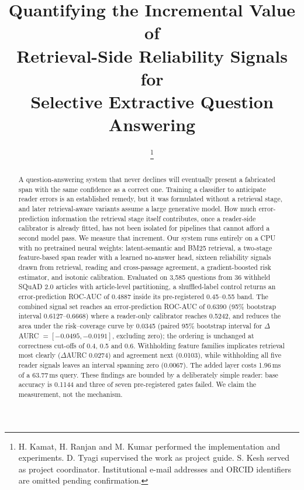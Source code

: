 \documentclass[conference]{IEEEtran}
\begin{document}
\title{Quantifying the Incremental Value of\\ Retrieval-Side Reliability Signals for\\ Selective Extractive Question Answering}

\author{%
%
\thanks{H. Kamat, H. Ranjan and M. Kumar performed the implementation and
experiments. D. Tyagi supervised the work as project guide. S. Kesh served as
project coordinator. Institutional e-mail addresses and ORCID identifiers are
omitted pending confirmation.}%
}

\maketitle

\begin{abstract}
A question-answering system that never declines will eventually present a
fabricated span with the same confidence as a correct one. Training a classifier
to anticipate reader errors is an established remedy, but it was formulated
without a retrieval stage, and later retrieval-aware variants assume a large
generative model. How much error-prediction information the retrieval stage
itself contributes, once a reader-side calibrator is already fitted, has not been
isolated for pipelines that cannot afford a second model pass. We measure that
increment. Our system runs entirely on a CPU with no pretrained neural weights:
latent-semantic and BM25 retrieval, a two-stage feature-based span reader with a
learned no-answer head, sixteen reliability signals drawn from retrieval, reading
and cross-passage agreement, a gradient-boosted risk estimator, and isotonic
calibration. Evaluated on 3{,}585 questions from 36 withheld SQuAD 2.0 articles
with article-level partitioning, a shuffled-label control returns an
error-prediction ROC-AUC of 0.4887 inside its pre-registered 0.45--0.55 band. The
combined signal set reaches an error-prediction ROC-AUC of 0.6390 (95\% bootstrap
interval 0.6127--0.6668) where a reader-only calibrator reaches 0.5242, and
reduces the area under the risk--coverage curve by 0.0345 (paired 95\% bootstrap
interval for $\Delta$AURC $= [-0.0495,-0.0191]$, excluding zero); the ordering is
unchanged at correctness cut-offs
of 0.4, 0.5 and 0.6. Withholding feature families implicates retrieval most
clearly ($\Delta$AURC 0.0274) and agreement next (0.0103), while withholding all
five reader signals leaves an interval spanning zero (0.0067). The added layer
costs 1.96\,ms of a 63.77\,ms query. These findings are bounded by a deliberately
simple reader: base accuracy is 0.1144 and three of seven pre-registered gates
failed. We claim the measurement, not the mechanism.
\end{abstract}
\end{document}
